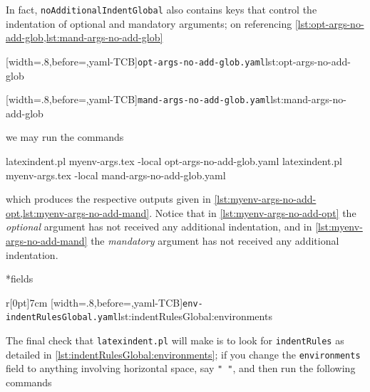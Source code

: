In fact, \texttt{noAdditionalIndentGlobal} also contains keys that control the indentation of optional and mandatory
arguments; on referencing \cref{lst:opt-args-no-add-glob,lst:mand-args-no-add-glob}

\begin{minipage}{.49\textwidth}
[width=.8\linewidth,before=\centering,yaml-TCB]{\texttt{opt-args-no-add-glob.yaml}}{lst:opt-args-no-add-glob}
\end{minipage}
\hfill
\begin{minipage}{.49\textwidth}
[width=.8\linewidth,before=\centering,yaml-TCB]{\texttt{mand-args-no-add-glob.yaml}}{lst:mand-args-no-add-glob}
\end{minipage}

we may run the commands
\begin{commandshell}
latexindent.pl  myenv-args.tex -local opt-args-no-add-glob.yaml
latexindent.pl  myenv-args.tex -local mand-args-no-add-glob.yaml
\end{commandshell}
which produces the respective outputs given in \cref{lst:myenv-args-no-add-opt,lst:myenv-args-no-add-mand}. Notice that in \cref{lst:myenv-args-no-add-opt}
the \emph{optional} argument has not received any additional indentation, and in \cref{lst:myenv-args-no-add-mand} the \emph{mandatory} argument
has not received any additional indentation.

\begin{minipage}{.45\textwidth}
\end{minipage}
\hfill
\begin{minipage}{.45\textwidth}
\end{minipage}

*{fields}
\begin{wrapfigure}[4]{r}[0pt]{7cm}
[width=.8\linewidth,before=\centering,yaml-TCB]{\texttt{env-indentRulesGlobal.yaml}}{lst:indentRulesGlobal:environments}
\end{wrapfigure}
The final check that \texttt{latexindent.pl} will make is to look for \texttt{indentRules} as detailed in \cref{lst:indentRulesGlobal:environments}; if you change the \texttt{environments}
field to anything involving horizontal space, say \lstinline!" "!, and then run the following commands

